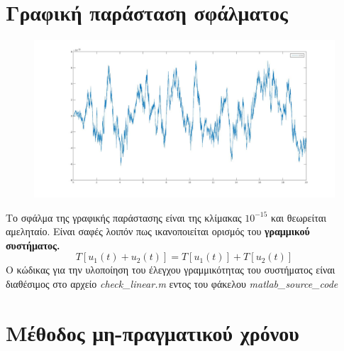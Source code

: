 \documentclass{article}
\begin{document}
\section*{Γραφική παράσταση σφάλματος}
 \begin{figure}[h!]
\centering
 	\advance\leftskip-7.5cm
  \includegraphics[width=265mm,scale=2]{assets/error.jpg}
\end{figure}Το σφάλμα της γραφικής παράστασης είναι της κλίμακας $10^{-15}$ και θεωρείται αμεληταίο. Είναι σαφές λοιπόν πως ικανοποιείται ορισμός του \textbf{γραμμικού συστήματος.}
\begin{equation*}
\boxed{
T\left[u_1(t) + u_2(t)\right] = T\left[u_1(t)\right] + T\left[u_2(t)\right]
}
\end{equation*}
Ο κώδικας για την υλοποίηση του έλεγχου γραμμικότητας του συστήματος είναι διαθέσιμος στο αρχείο \textit{check\_linear.m} εντος του φάκελου  \textit{matlab\_source\_code}
 
\clearpage
\Large
\section*{Μέθοδος μη-πραγματικού χρόνου}
\end{document}
